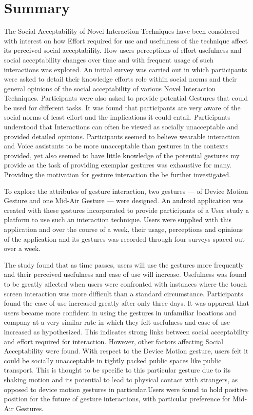 \documentclass{l4proj}
\begin{document}
\section{Summary}
The Social Acceptability of Novel Interaction Techniques have been considered with interest on how Effort required for use and usefulness of the technique affect its perceived social acceptability. How users perceptions of effort usefulness and social acceptability changes over time and with frequent usage of such interactions was explored. An initial survey was carried out in which participants were asked to detail their knowledge efforts role within social norms and their general opinions of the social acceptability of various Novel Interaction Techniques. Participants were also asked to provide potential Gestures that could be used for different tasks. It was found that participants are very aware of the social norms of least effort and the implications it could entail. Participants understood that Interactions can often be viewed as socially unacceptable and provided detailed opinions. Participants seemed to believe wearable interaction and Voice assistants to be more unacceptable than gestures in the contexts provided, yet also seemed to have little knowledge of the potential gestures my provide as the task of providing exemplar gestures was exhaustive for many. Providing the motivation for gesture interaction the be further investigated.

To explore the attributes of gesture interaction, two gestures --- of Device Motion Gesture and one Mid-Air Gesture --- were designed. An android application was created with these gestures incorporated to provide participants of a User study a platform to use such an interaction technique. Users were supplied with this application and over the course of a week, their usage, perceptions and opinions of the application and its gestures was recorded through four surveys spaced out over a week.

The study found that as time passes, users will use the gestures more frequently and their perceived usefulness and ease of use will increase. Usefulness was found to be greatly affected when users were confronted with instances where the touch screen interaction was more difficult than a standard circumstance. Participants found the ease of use increased greatly after only three days. It was apparent that users became more confident in using the gestures in unfamiliar locations and company at a very similar rate in which they felt usefulness and ease of use increased as hypothesized. This indicates strong links between social acceptability and effort required for interaction. However, other factors affecting Social Acceptability were found. With respect to the Device Motion gesture, users felt it could be socially unacceptable in tightly packed public spaces like public transport. This is thought to be specific to this particular gesture due to its shaking motion and its potential to lead to physical contact with strangers, as opposed to device motion gestures in particular.Users were found to hold positive position for the future of gesture interactions, with particular preference for Mid-Air Gestures. 
\end{document}
